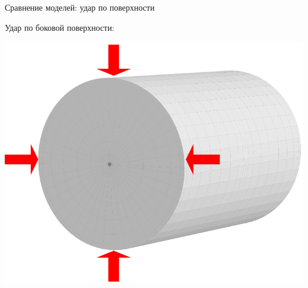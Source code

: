 \documentclass[usenames,dvipsnames]{beamer}
\begin{document}
\begin{frame}{Сравнение моделей: удар по поверхности}
\begin{minipage}{\textwidth}
	\begin{minipage}[b]{0.65\textwidth}
		\flushleft
		Удар по боковой поверхности:
	\end{minipage}
	\hfill
	\begin{minipage}[b]{0.34\textwidth}
		\includegraphics[width=\linewidth]{Figures/ImpactScheme2}
	\end{minipage}
\end{minipage}


\end{frame}
\end{document}
